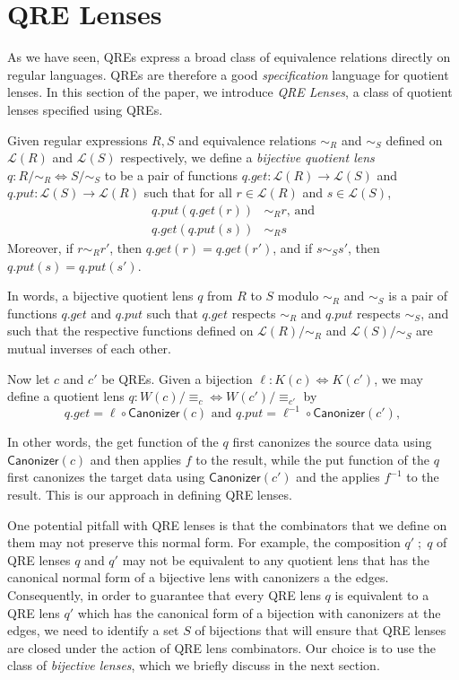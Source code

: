 \documentclass[acmsmall,review,anonymous]{acmart}\settopmatter{printfolios=true,printccs=false,printacmref=false}
\newcommand{\kw}[1]{\ensuremath{\mathsf{#1}}}
\newcommand{\canonizer}{\ensuremath{\kw{Canonizer}}}
\newcommand{\eqrel}[1]{\ensuremath{\equiv_{#1}}}
\begin{document}
\section{QRE Lenses}
\label{QRE-lenses}
As we have seen, QREs express a broad class of equivalence relations
directly on regular languages.  QREs are therefore a good \textit{specification}
language for quotient lenses. In this section of the paper, we introduce
\textit{QRE Lenses}, a class of quotient lenses specified using QREs.

Given regular expressions $R, S$ and equivalence relations
$\sim_R$ and $\sim_S$ defined on $\mathcal{L}(R)$ and $\mathcal{L}(S)$
respectively, we define a {\em bijective quotient lens} $q : R /{\sim_R}
\Leftrightarrow S/{\sim_S}$ to be a pair of functions $q.get :
\mathcal{L}(R) \longrightarrow \mathcal{L}(S)$ and $q.put : \mathcal{L}(S)
\longrightarrow \mathcal{L}(R)$ such that for all $r \in \mathcal{L}(R)$ and $s
\in \mathcal{L}(S)$,
\begin{align*}
q.put(q.get(r)) &\sim_R r \text{, and}\\
q.get(q.put(s)) &\sim_R s
\end{align*}
Moreover, if $r \sim_R r'$, then $q.get(r) = q.get(r')$, and if $s \sim_S s'$,
then $q.put(s) = q.put(s')$.

In words, a bijective quotient lens $q$ from $R$ to $S$ modulo $\sim_R$
and $\sim_S$ is a pair of functions $q.get$ and $q.put$ such that $q.get$
respects $\sim_R$ and $q.put$ respects $\sim_S$, and such that the respective
functions defined on $\mathcal{L}(R)/{\sim_R}$ and $\mathcal{L}(S)/{\sim_S}$ are
mutual inverses of each other.

Now let $c$ and $c'$ be QREs. Given a bijection $\ell : K(c) \Leftrightarrow
K(c')$, we may define a quotient lens $q : W(c)/\eqrel{c} \Leftrightarrow
W(c')/\eqrel{c'}$ by
\begin{equation}\label{normalform}
q.get = \ell \circ \canonizer(c) \text{ and } q.put = \ell^{-1} \circ
\canonizer(c'),
\end{equation}

\noindent In other words, the get function of the $q$ first canonizes the source
data using $\canonizer(c)$ and then applies $f$ to the result, while the
put function of the $q$ first canonizes the target data using
$\canonizer(c')$ and the applies $f^{-1}$ to the result. This is our approach in
defining QRE lenses.

One potential pitfall with QRE lenses is that the combinators that
we define on them may not preserve this normal form. For example, the
composition $q' \; ; \; q$ of QRE lenses $q$ and $q'$ may not be equivalent to
any quotient lens that has the canonical normal form of a bijective lens with
canonizers a the edges. Consequently, in order to guarantee that every QRE
lens $q$ is equivalent to a QRE lens $q'$ which has the canonical form of
a bijection with canonizers at the edges, we need to identify a set $S$ of
bijections that will ensure that QRE lenses are closed under the action of QRE
lens combinators. Our choice is to use the class of \textit{bijective lenses},
which we briefly discuss in the next section.
\end{document}
